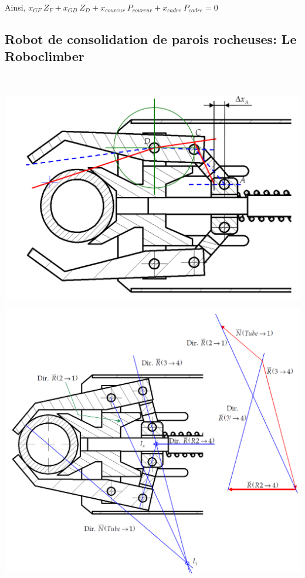 Ainsi, $x_{GF}~Z_{F}+x_{GD}~Z_{D}+x_{coureur}~P_{coureur}+x_{cadre}~P_{cadre}=0$

\newpage

\subsection{Robot de consolidation de parois rocheuses: Le \og Roboclimber \fg}

~\

\begin{center}
 \includegraphics[width=0.8\linewidth]{img/climb1_cor}
\end{center}
 
\begin{center}
 \includegraphics[width=0.9\linewidth]{img/climb2_cor}
\end{center}

